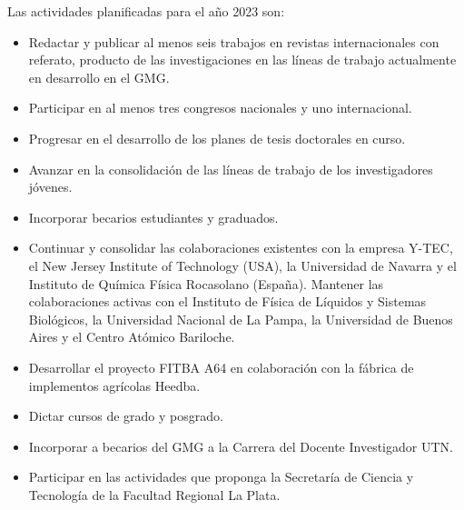 \documentclass[a4paper,11pt,twoside,final,titlepage,onecolumn,openright]{report}
\begin{document}
Las actividades planificadas para el año 2023 son:

\begin{itemize}
\item  Redactar y publicar al menos seis trabajos en revistas internacionales con referato, producto de las investigaciones en las líneas de trabajo actualmente en desarrollo en el GMG.
\item  Participar en al menos tres congresos nacionales y uno internacional. 
\item  Progresar en el desarrollo de los planes de tesis doctorales en curso.
\item  Avanzar en la consolidación de las líneas de trabajo de los investigadores jóvenes. 
\item  Incorporar becarios estudiantes y graduados. 
\item  Continuar y consolidar las colaboraciones existentes con la empresa Y-TEC, el New Jersey Institute of Technology (USA), la Universidad de Navarra y el Instituto de Química Física Rocasolano (España). Mantener las colaboraciones activas con el Instituto de Física de Líquidos y Sistemas Biológicos, la Universidad Nacional de La Pampa, la Universidad de Buenos Aires y el Centro Atómico Bariloche.
\item Desarrollar el proyecto FITBA A64 en colaboración con la fábrica de implementos agrícolas Heedba.
\item  Dictar cursos de grado y posgrado.
\item  Incorporar a becarios del GMG a la Carrera del Docente Investigador UTN.
\item  Participar en las actividades que proponga la Secretaría de Ciencia y Tecnología de la Facultad Regional La Plata.
\end{itemize}
\end{document}
